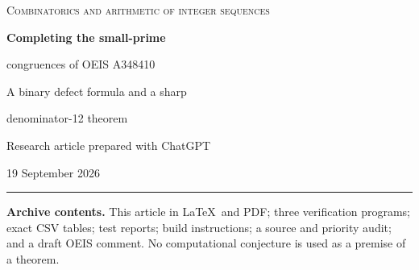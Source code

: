 \documentclass[11pt,a4paper]{article}
\numberwithin{equation}{section}
\theoremstyle{definition}
\theoremstyle{remark}
\newcommand{\Z}{\mathbb Z}
\newcommand{\A}{A_{\alpha,\beta}}
\begin{document}
\begin{titlepage}
\thispagestyle{empty}
\vspace*{11mm}
{\color{accent}\large\scshape Combinatorics and arithmetic of integer sequences\par}
\vspace{10mm}
{\color{ink}\LARGE\bfseries Completing the small-prime\par
congruences of OEIS A348410\par}
\vspace{6mm}
{\Large A binary defect formula and a sharp\par denominator-12 theorem\par}
\vspace{10mm}
{\large Research article prepared with ChatGPT\par}
{19 September 2026\par}
\vspace{9mm}
\hrule
\vspace{5mm}
\begin{abstract}
Let $a(n)=[x^n]((1-x)(1-x^2))^{-n}$. An OEIS comment of Peter Bala
conjectures the cubic congruence $a(mp^r)\equiv a(mp^{r-1})\pmod{p^{3r}}$
for primes $p\ge5$. A source audit located a prior elementary proof candidate
for that assertion and a two-parameter extension; we therefore do not present
the odd-prime result as a new resolution. Instead, we investigate the binary
case explicitly left untreated in that source.

For $\A(n)=[x^n](1-x)^{-\alpha n}(1+x)^{-\beta n}$, with arbitrary
integer parameters, we prove an explicit first-defect congruence modulo
$2^{3r-2}$. It gives a sharp universal modulus $2^{3r-3}$, improved to
$2^{3r-2}$ when $\alpha\beta$ is even. Combining this with a self-contained
odd-prime proof gives $12n^{-3}\sum_{d\mid n}\mu(d)a(n/d)\in\Z$ for every
$n\ge1$. The constant $12$ is the smallest possible common denominator.
We also obtain a primitive-necklace divisibility theorem, explain the failure
of an overbroad periodic-coefficient argument, derive algebraic generating
functions and two correction terms in the asymptotic expansion, and provide
exact reproducible checks. Mathematical completeness of the written proofs
and global priority are separate matters: no claim of exhaustive novelty
verification or external peer review is made.
\end{abstract}
\vfill
\noindent\small
\textbf{Archive contents.} This article in \LaTeX\ and PDF; three verification
programs; exact CSV tables; test reports; build instructions; a source and
priority audit; and a draft OEIS comment. No computational conjecture is used
as a premise of a theorem.
\end{titlepage}
\end{document}
